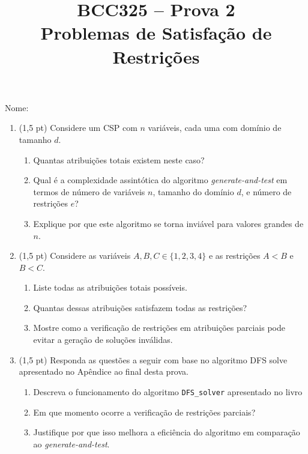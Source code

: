 \documentclass[12pt]{article}
\title{BCC325 – Prova 2\\ Problemas de Satisfação de Restrições}
\author{}
\date{}
\begin{document}
\maketitle

\vspace{-2cm}

Nome:

\begin{enumerate}

    \item (1,5 pt) Considere um CSP com \( n \) variáveis, cada uma com domínio de tamanho \( d \).
    
    \begin{enumerate}[label=\alph*)]
        \item Quantas atribuições totais existem neste caso?
        \item Qual é a complexidade assintótica do algoritmo \textit{generate-and-test} em termos de número de variáveis \( n \), tamanho do domínio \( d \), e número de restrições \( e \)?
        \item Explique por que este algoritmo se torna inviável para valores grandes de \( n \).
    \end{enumerate}
    
    \item (1,5 pt) Considere as variáveis \( A, B, C \in \{1, 2, 3, 4\} \) e as restrições \( A < B \) e \( B < C \).
    
    \begin{enumerate}[label=\alph*)]
        \item Liste todas as atribuições totais possíveis.
        \item Quantas dessas atribuições satisfazem todas as restrições?
        \item Mostre como a verificação de restrições em atribuições parciais pode evitar a geração de soluções inválidas.
    \end{enumerate}

    \item (1,5 pt) Responda as questões a seguir com base no algoritmo DFS solve apresentado no Apêndice ao final desta prova.

    \begin{enumerate}[label=\alph*)]
        \item Descreva o funcionamento do algoritmo \texttt{DFS\_solver} apresentado no livro 
        \item Em que momento ocorre a verificação de restrições parciais?
        \item Justifique por que isso melhora a eficiência do algoritmo em comparação ao \textit{generate-and-test}.
    \end{enumerate}


\end{enumerate}
\end{document}

